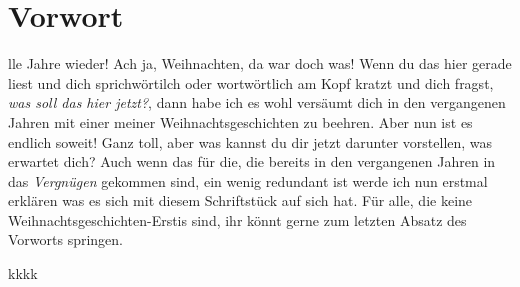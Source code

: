 \documentclass[11pt]{article}
\author{simmi}
\date{\today}
\title{}
\begin{document}
\titlepage \tableofcontents \clearpage\renewcommand\thesection{}
\section{Vorwort}
\label{sec:org7b62de3}
lle Jahre wieder! Ach ja, Weihnachten, da war doch was! Wenn du
das hier gerade liest und dich sprichwörtilch oder wortwörtlich am
Kopf kratzt und dich fragst, \emph{was soll das hier jetzt?}, dann habe ich
es wohl versäumt dich in den vergangenen Jahren mit einer meiner
Weihnachtsgeschichten zu beehren. Aber nun ist es endlich soweit! Ganz
toll, aber was kannst du dir jetzt darunter vorstellen, was erwartet
dich? Auch wenn das für die, die bereits in den vergangenen Jahren in
das \emph{Vergnügen} gekommen sind, ein wenig redundant ist werde ich nun
erstmal erklären was es sich mit diesem Schriftstück auf sich hat. Für
alle, die keine Weihnachtsgeschichten-Erstis sind, ihr könnt gerne zum
letzten Absatz des Vorworts springen.

\noindent kkkk

\setcounter{section}{0}
\renewcommand\thesection{Kapitel \arabic{section}:}
\end{document}
